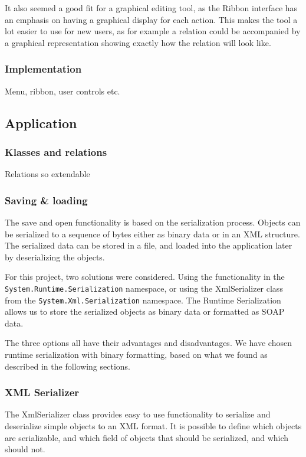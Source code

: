 It also seemed a good fit for a graphical editing tool, as the Ribbon interface
has an emphasis on having a graphical display for each action. This makes the
tool a lot easier to use for new users, as for example a relation could be
accompanied by a graphical representation showing exactly how the relation will
look like.  \subsubsection{Implementation} Menu, ribbon, user controls etc.


\subsection{Application} 

\subsubsection{Klasses and relations}
Relations so extendable

\subsubsection{Saving \& loading}
The save and open functionality is based on the serialization process. Objects
can be serialized to a sequence of bytes either as binary data or in an XML
structure. The serialized data can be stored in a file, and loaded into the
application later by deserializing the objects.

For this project, two solutions were considered. Using the functionality in the
\texttt{System.Runtime.Serialization} namespace, or using the XmlSerializer
class from the \texttt{System.Xml.Serialization} namespace. The Runtime
Serialization allows us to store the serialized objects as binary data or
formatted as SOAP data.

The three options all have their advantages and disadvantages. We have chosen
runtime serialization with binary formatting, based on what we found as
described in the following sections.

\subsubsection{XML Serializer} 

The XmlSerializer class provides easy to use
functionality to serialize and deserialize simple objects to an XML format. It
is possible to define which objects are serializable, and which field of objects
that should be serialized, and which should not.

